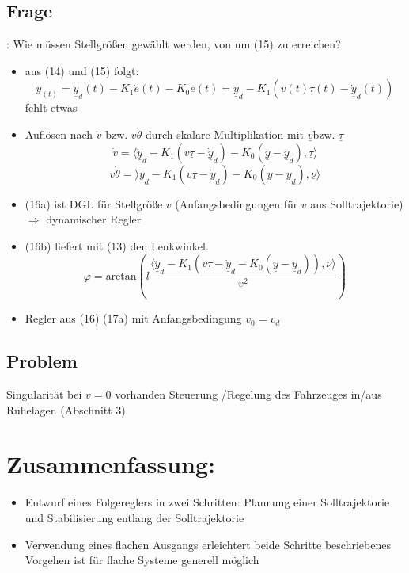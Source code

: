 \documentclass[ngerman]{tudscrreprt}
\begin{document}
\subsection*{Frage}: Wie müssen Stellgrößen gewählt werden, von um (15) zu erreichen? 
\begin{itemize}
\item aus (14) und (15) folgt: 
\begin{equation*}
\ddot{y}_(t)= \underline{\ddot{y}}_d(t) - K_1\underline{\dot{e}}(t) - K_0 \underline{e}(t) = \underline{\ddot{y}}_d - K_1(v(t)\underline{\tau}(t) - \underline{\dot{y}}_d(t)) 
\end{equation*}
fehlt etwas
\item 
Auflösen nach $\dot v$ bzw. $v \dot{\theta}$ durch skalare Multiplikation mit $\underline{v}$bzw.  $\underline{\tau}$ 
\begin{equation*}
\dot v = \langle \underline{\ddot y}_d - K_1 (v \underline \tau - \underline{\dot y}_d ) - K_0 (\underline y - \underline y_d), \underline{\tau} \rangle \tag{16a}
\end{equation*}
\begin{equation*}
v \dot{\theta} = \rangle \underline{\dot{y}}_d - K_1(v\underline{\tau}- \underline{\dot{y}}_d) -K_0(\underline y - \underline y_d), \underline \nu \rangle \tag{16b}
\end{equation*}
\item (16a) ist DGL für Stellgröße $v$ (Anfangsbedingungen für $v$ aus Solltrajektorie)$\Rightarrow$ dynamischer Regler
\item (16b) liefert mit (13) den Lenkwinkel. 
\begin{equation*}
\varphi = \text{arctan}(  l\frac{\langle \underline{\ddot{y}}_d - K_1(v\underline{\tau} - \underline{\dot y}_d - K_0 (\underline y - \underline{y}_d)), \underline{\nu}  \rangle}{v^2})
\end{equation*}
\item Regler aus (16) (17a) mit Anfangsbedingung $v_0 = v_d$
\end{itemize}
\subsection*{Problem} Singularität bei $v=0$ vorhanden Steuerung /Regelung des Fahrzeuges in/aus Ruhelagen (Abschnitt 3)
\section*{Zusammenfassung:}\begin{itemize}
\item Entwurf eines Folgereglers in zwei Schritten: Plannung einer Solltrajektorie und Stabilisierung entlang der Solltrajektorie
\item Verwendung eines flachen Ausgangs erleichtert beide Schritte beschriebenes Vorgehen ist für flache Systeme generell möglich 
\end{itemize}
\end{document}
